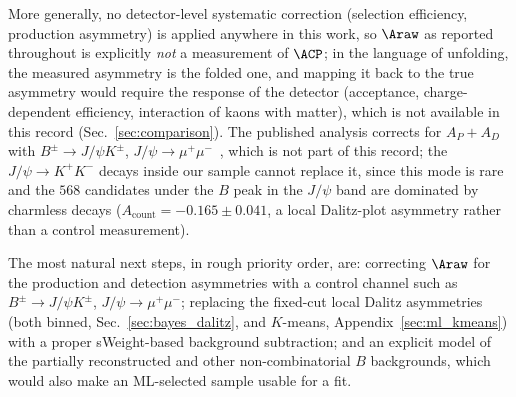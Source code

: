 More generally, no detector-level systematic correction (selection efficiency, production asymmetry) is applied anywhere in this work, so $\Araw$ as reported throughout is explicitly \emph{not} a measurement of $\ACP$; in the language of unfolding, the measured asymmetry is the folded one, and mapping it back to the true asymmetry would require the response of the detector (acceptance, charge-dependent efficiency, interaction of kaons with matter), which is not available in this record (Sec.~\ref{sec:comparison}). The published analysis corrects for $A_P+A_D$ with $B^\pm\to J/\psi K^\pm$, $J/\psi\to\mu^+\mu^-$~\cite{lhcb_cpv_prd2023}, which is not part of this record; the $J/\psi\to K^+K^-$ decays inside our sample cannot replace it, since this mode is rare and the $568$ candidates under the $B$ peak in the $J/\psi$ band are dominated by charmless decays ($A_{\mathrm{count}}=-0.165\pm0.041$, a local Dalitz-plot asymmetry rather than a control measurement).

The most natural next steps, in rough priority order, are: correcting $\Araw$ for the production and detection asymmetries with a control channel such as $B^\pm\to J/\psi K^\pm$, $J/\psi\to\mu^+\mu^-$; replacing the fixed-cut local Dalitz asymmetries (both binned, Sec.~\ref{sec:bayes_dalitz}, and $K$-means, Appendix~\ref{sec:ml_kmeans}) with a proper sWeight-based background subtraction; and an explicit model of the partially reconstructed and other non-combinatorial $B$ backgrounds, which would also make an ML-selected sample usable for a fit.
